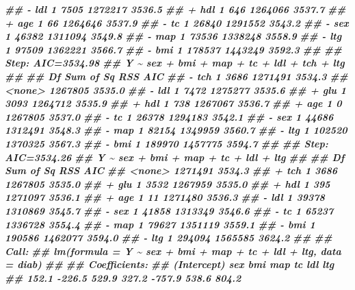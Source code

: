 \documentclass[
]{book}
\newenvironment{Shaded}{\begin{snugshade}}{\end{snugshade}}
\newcommand{\DocumentationTok}[1]{\textcolor[rgb]{0.56,0.35,0.01}{\textbf{\textit{#1}}}}
\theoremstyle{definition}
\theoremstyle{definition}
\theoremstyle{definition}
\theoremstyle{definition}
\theoremstyle{remark}
\begin{document}
\begin{Shaded}
\begin{Highlighting}[]
\DocumentationTok{\#\# {-} ldl   1      7505 1272217 3536.5}
\DocumentationTok{\#\# + hdl   1       646 1264066 3537.7}
\DocumentationTok{\#\# + age   1        66 1264646 3537.9}
\DocumentationTok{\#\# {-} tc    1     26840 1291552 3543.2}
\DocumentationTok{\#\# {-} sex   1     46382 1311094 3549.8}
\DocumentationTok{\#\# {-} map   1     73536 1338248 3558.9}
\DocumentationTok{\#\# {-} ltg   1     97509 1362221 3566.7}
\DocumentationTok{\#\# {-} bmi   1    178537 1443249 3592.3}
\DocumentationTok{\#\# }
\DocumentationTok{\#\# Step:  AIC=3534.98}
\DocumentationTok{\#\# Y \textasciitilde{} sex + bmi + map + tc + ldl + tch + ltg}
\DocumentationTok{\#\# }
\DocumentationTok{\#\#        Df Sum of Sq     RSS    AIC}
\DocumentationTok{\#\# {-} tch   1      3686 1271491 3534.3}
\DocumentationTok{\#\# \textless{}none\textgreater{}              1267805 3535.0}
\DocumentationTok{\#\# {-} ldl   1      7472 1275277 3535.6}
\DocumentationTok{\#\# + glu   1      3093 1264712 3535.9}
\DocumentationTok{\#\# + hdl   1       738 1267067 3536.7}
\DocumentationTok{\#\# + age   1         0 1267805 3537.0}
\DocumentationTok{\#\# {-} tc    1     26378 1294183 3542.1}
\DocumentationTok{\#\# {-} sex   1     44686 1312491 3548.3}
\DocumentationTok{\#\# {-} map   1     82154 1349959 3560.7}
\DocumentationTok{\#\# {-} ltg   1    102520 1370325 3567.3}
\DocumentationTok{\#\# {-} bmi   1    189970 1457775 3594.7}
\DocumentationTok{\#\# }
\DocumentationTok{\#\# Step:  AIC=3534.26}
\DocumentationTok{\#\# Y \textasciitilde{} sex + bmi + map + tc + ldl + ltg}
\DocumentationTok{\#\# }
\DocumentationTok{\#\#        Df Sum of Sq     RSS    AIC}
\DocumentationTok{\#\# \textless{}none\textgreater{}              1271491 3534.3}
\DocumentationTok{\#\# + tch   1      3686 1267805 3535.0}
\DocumentationTok{\#\# + glu   1      3532 1267959 3535.0}
\DocumentationTok{\#\# + hdl   1       395 1271097 3536.1}
\DocumentationTok{\#\# + age   1        11 1271480 3536.3}
\DocumentationTok{\#\# {-} ldl   1     39378 1310869 3545.7}
\DocumentationTok{\#\# {-} sex   1     41858 1313349 3546.6}
\DocumentationTok{\#\# {-} tc    1     65237 1336728 3554.4}
\DocumentationTok{\#\# {-} map   1     79627 1351119 3559.1}
\DocumentationTok{\#\# {-} bmi   1    190586 1462077 3594.0}
\DocumentationTok{\#\# {-} ltg   1    294094 1565585 3624.2}
\DocumentationTok{\#\# }
\DocumentationTok{\#\# Call:}
\DocumentationTok{\#\# lm(formula = Y \textasciitilde{} sex + bmi + map + tc + ldl + ltg, data = diab)}
\DocumentationTok{\#\# }
\DocumentationTok{\#\# Coefficients:}
\DocumentationTok{\#\# (Intercept)          sex          bmi          map           tc          ldl          ltg  }
\DocumentationTok{\#\#       152.1       {-}226.5        529.9        327.2       {-}757.9        538.6        804.2}
\end{Highlighting}
\end{Shaded}
\end{document}
